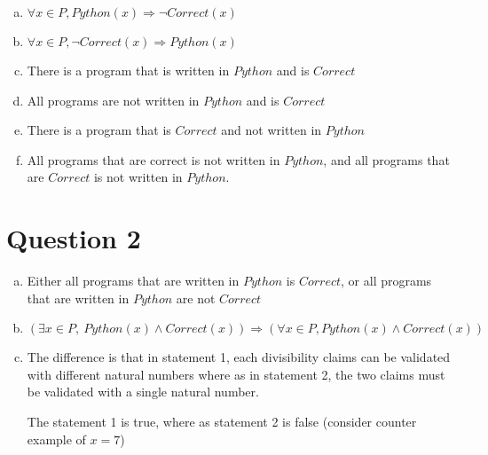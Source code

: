 \documentclass[12pt]{article}
\begin{document}
\begin{enumerate}[a.]
    \item $\forall x \in P, Python(x) \Rightarrow \neg Correct(x)$
    \item $\forall x \in P, \neg Correct(x) \Rightarrow Python(x)$
    \item There is a program that is written in $Python$ and is $Correct$
    \item All programs are not written in $Python$ and is $Correct$
    \item There is a program that is $Correct$ and not written in $Python$
    \item All programs that are correct is not written in $Python$, and all
    programs that are $Correct$ is not written in $Python$.
\end{enumerate}

\section*{Question 2}
\begin{enumerate}[a.]
    \item Either all programs that are written in $Python$ is $Correct$, or
    all programs that are written in $Python$ are not $Correct$
    \item $(\exists x \in P,\:Python(x) \land Correct(x)) \Rightarrow
    (\forall x \in P, Python(x) \land Correct(x))$
    \item The difference is that in statement 1, each divisibility claims can be
    validated with different natural numbers where as in statement 2,
    the two claims must be validated with a single natural number.

    \bigskip

    The statement 1 is true, where as statement 2 is false (consider counter example
    of $x = 7$)
\end{enumerate}
\end{document}
